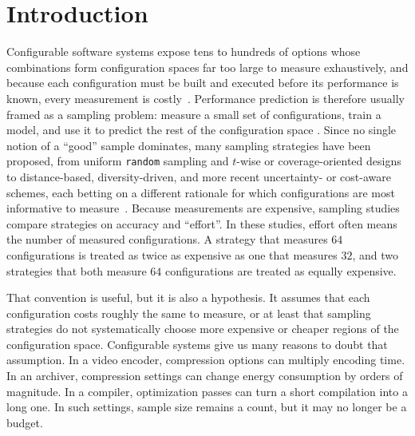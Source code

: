 \section{Introduction}
\label{sec:introduction}

Configurable software systems expose tens to hundreds of options whose
combinations form configuration spaces far too large to measure exhaustively,
and because each configuration must be built and executed before its
performance is known, every measurement is costly~\cite{julianasurvey}.
Performance prediction is therefore usually framed as
a sampling problem: measure a small set of configurations, train a model, and
use it to predict the rest of the configuration space
\cite{guo2013ASE,sarkar2015,siegmund2015FSE,kaltenecker2019,julianasurvey,JVKSK:SEAMS17,jamshidi2018,dorn2026bayesian}.
Since no single notion of a ``good'' sample dominates, many sampling strategies
have been proposed, from uniform \texttt{random} sampling and $t$-wise or
coverage-oriented designs to distance-based, diversity-driven, and more recent
uncertainty- or cost-aware schemes, each betting on a different rationale for
which configurations are most informative to
measure~\cite{guo2013ASE,DBLP:journals/tse/HenardPPKHT14,kaltenecker2019,sarkar2015,nair2018c}.
 Because measurements are expensive, sampling studies compare strategies on
accuracy and ``effort''. In these studies, effort often means the
number of measured configurations. A strategy that measures $64$
configurations is treated as twice as expensive as one that measures $32$, and
two strategies that both measure $64$ configurations are treated as equally
expensive.

That convention is useful, but it is also a hypothesis. It assumes that each
configuration costs roughly the same to measure, or at least that sampling
strategies do not systematically choose more expensive or cheaper regions of
the configuration space. Configurable systems give us many reasons to doubt
that assumption. In a video encoder, compression options can multiply encoding
time. In an archiver, compression settings can change energy consumption by
orders of magnitude. In a compiler, optimization passes can turn a short
compilation into a long one. In such settings, sample size remains a count,
but it may no longer be a budget.

